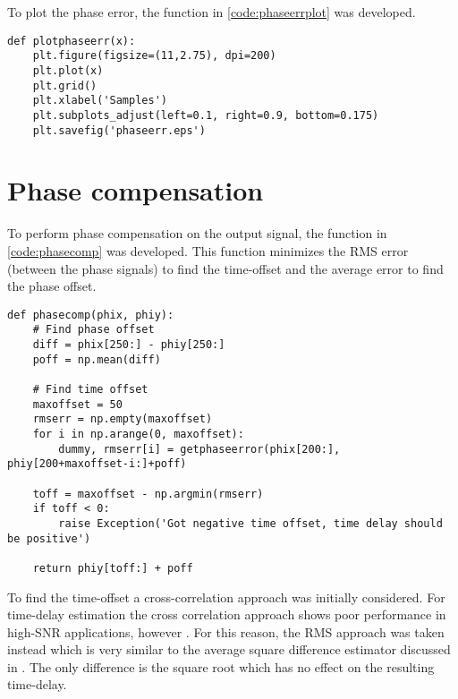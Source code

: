 To plot the phase error, the function in \cref{code:phaseerrplot} was developed.
\lstset{language=python,caption=Function for plotting phase errors,label=code:phaseerrplot}
\begin{lstlisting}
def plotphaseerr(x):
    plt.figure(figsize=(11,2.75), dpi=200)  
    plt.plot(x)
    plt.grid()
    plt.xlabel('Samples')
    plt.subplots_adjust(left=0.1, right=0.9, bottom=0.175)
    plt.savefig('phaseerr.eps')  
\end{lstlisting}


\section{Phase compensation}
To perform phase compensation on the output signal, the function in \cref{code:phasecomp} was developed. This function minimizes the RMS error (between the phase signals) to find the time-offset and the average error to find the phase offset.\\

\lstset{language=python,caption=Function for performing phase compensation,label=code:phasecomp}
\begin{lstlisting}
def phasecomp(phix, phiy):
    # Find phase offset
    diff = phix[250:] - phiy[250:]
    poff = np.mean(diff)

    # Find time offset
    maxoffset = 50
    rmserr = np.empty(maxoffset)
    for i in np.arange(0, maxoffset):
        dummy, rmserr[i] = getphaseerror(phix[200:], phiy[200+maxoffset-i:]+poff)

    toff = maxoffset - np.argmin(rmserr)
    if toff < 0:
        raise Exception('Got negative time offset, time delay should be positive')

    return phiy[toff:] + poff
\end{lstlisting}

\begin{sloppypar}
  To find the time-offset a cross-correlation approach was initially considered. For time-delay estimation the cross correlation approach shows poor performance in high-SNR applications, however \cite{193195}. For this reason, the RMS approach was taken instead which is very similar to the average square difference estimator discussed in \cite{193195}. The only difference is the square root which has no effect on the resulting time-delay.
\end{sloppypar}

